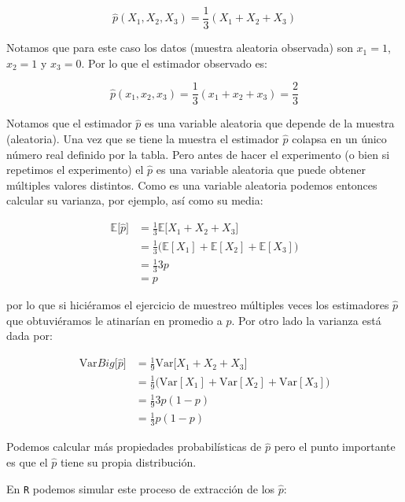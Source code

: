 \documentclass[
]{book}
\begin{document}
\[
\hat{p}(X_1, X_2, X_3) = \frac{1}{3}(X_1 + X_2 + X_3)
\]

Notamos que para este caso los datos (muestra aleatoria observada) son \(x_1 = 1\), \(x_2 = 1\) y \(x_3 = 0\). Por lo que el estimador observado es:

\[
\hat{p}(x_1, x_2, x_3) = \frac{1}{3}(x_1 + x_2 + x_3) = \frac{2}{3}
\]

Notamos que el estimador \(\hat{p}\) es una variable aleatoria que depende de la muestra (aleatoria). Una vez que se tiene la muestra el estimador \(\hat{p}\) colapsa en un único número real definido por la tabla. Pero antes de hacer el experimento (o bien si repetimos el experimento) el \(\hat{p}\) es una variable aleatoria que puede obtener múltiples valores distintos. Como es una variable aleatoria podemos entonces calcular su varianza, por ejemplo, así como su media:

\[
\begin{aligned}
\mathbb{E}\Big[ \hat{p} \Big] & =  \frac{1}{3}\mathbb{E}\big[ X_1 + X_2 + X_3\big]
\\ & = \frac{1}{3}\big( \mathbb{E}[ X_1] + \mathbb{E}[ X_2] + \mathbb{E}[ X_3]\big)
\\ & = \frac{1}{3} 3p 
\\ & = p
\end{aligned}
\]

por lo que si hiciéramos el ejercicio de muestreo múltiples veces los estimadores \(\hat{p}\) que obtuviéramos le atinarían en promedio a \(p\). Por otro lado la varianza está dada por:

\[
\begin{aligned}
\textrm{Var}Big[ \hat{p} \Big] & =  \frac{1}{9}\textrm{Var}\big[ X_1 + X_2 + X_3\big]
\\ & = \frac{1}{9}\big( \textrm{Var}[ X_1] + \textrm{Var}[ X_2] + \textrm{Var}[ X_3]\big)
\\ & = \frac{1}{9} 3p (1 - p)
\\ & = \frac{1}{3} p (1 - p)
\end{aligned}
\]

Podemos calcular más propiedades probabilísticas de \(\hat{p}\) pero el punto importante es que el \(\hat{p}\) tiene su propia distribución.

En \texttt{R} podemos simular este proceso de extracción de los \(\hat{p}\):
\end{document}
